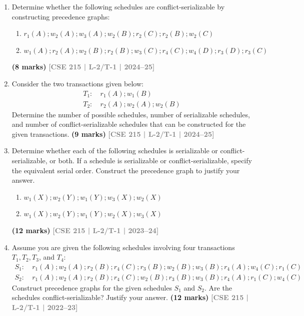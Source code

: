\documentclass[12pt]{article}
\newcommand{\yr}[1]{\hfill\textcolor{gray}{\small\textbf{[#1]}}}
\newcommand{\mk}[1]{\textcolor{orange!70!black}{\small\textbf{(#1 marks)}}}
\begin{document}
\begin{enumerate}

\item Determine whether the following schedules are conflict-serializable by constructing precedence graphs:
\begin{enumerate}
  \item $r_1(A); w_2(A); w_3(A); w_2(B); r_2(C); r_2(B); w_2(C)$
  \item $w_1(A); r_2(A); w_2(B); r_2(B); w_3(C); r_4(C); w_4(D); r_3(D); r_3(C)$
\end{enumerate}
\mk{8} \yr{CSE 215 | L-2/T-1 | 2024--25}


\item Consider the two transactions given below:
\begin{align*}
T_1\colon &\ r_1(A); w_1(B)\\
T_2\colon &\ r_2(A); w_2(A); w_2(B)
\end{align*}
Determine the number of possible schedules, number of serializable schedules, and number of conflict-serializable schedules that can be constructed for the given transactions.
\mk{9} \yr{CSE 215 | L-2/T-1 | 2024--25}


\item Determine whether each of the following schedules is serializable or conflict-serializable, or both. If a schedule is serializable or conflict-serializable, specify the equivalent serial order. Construct the precedence graph to justify your answer.
\begin{enumerate}
  \item $w_1(X); w_2(Y); w_1(Y); w_3(X); w_2(X)$
  \item $w_1(X); w_2(Y); w_1(Y); w_2(X); w_3(X)$
\end{enumerate}
\mk{12} \yr{CSE 215 | L-2/T-1 | 2023--24}


\item Assume you are given the following schedules involving four transactions $T_1, T_2, T_3$, and $T_4$:
\begin{align*}
S_1\colon &\ r_1(A); w_2(A); r_2(B); r_4(C); r_3(B); w_2(B); w_3(B); r_4(A); w_4(C); r_1(C)\\
S_2\colon &\ r_1(A); w_2(A); r_2(B); r_4(C); w_2(B); r_3(B); w_3(B); r_4(A); r_1(C); w_4(C)
\end{align*}
Construct precedence graphs for the given schedules $S_1$ and $S_2$. Are the schedules conflict-serializable? Justify your answer.
\mk{12} \yr{CSE 215 | L-2/T-1 | 2022--23}



\end{enumerate}
\end{document}
